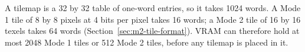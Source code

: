 A tilemap is a 32 by 32 table of one-word entries, so it takes 1024 words. A Mode 1 tile of 8 by 8 pixels at 4 bits per
pixel takes 16 words; a Mode 2 tile of 16 by 16 texels takes 64 words (Section~\ref{sec:m2-tile-format}). VRAM can
therefore hold at most 2048 Mode 1 tiles or 512 Mode 2 tiles, before any tilemap is placed in it.

